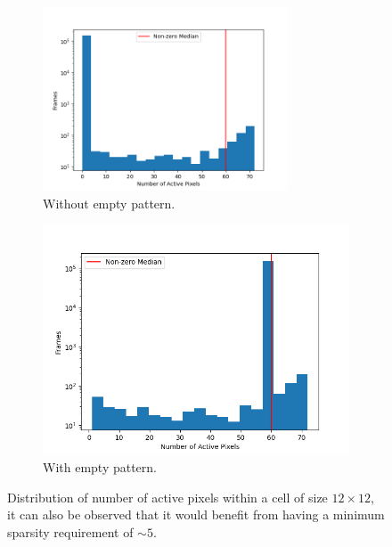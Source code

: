 \begin{figure}[H]
    \centering
    \begin{subfigure}[t]{\textwidth}
        \centering
        \includegraphics[width=0.8\textwidth]{resources/methodology/active_pixels_dist.png}
        \caption{Without empty pattern.}
    \end{subfigure}\hfill
    \begin{subfigure}[t]{0.8\textwidth}
        \centering
        \includegraphics[width=\textwidth]{resources/methodology/active_pixels_dist2.png}
        \caption{With empty pattern.}
    \end{subfigure}
    \caption{Distribution of number of active pixels within a cell of size $12\times 12$, it can also be observed that it would benefit from having a minimum sparsity requirement of $\sim 5$.}
    \label{fig:num_active_pixels_dist}
\end{figure}


